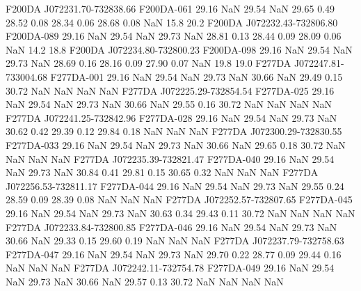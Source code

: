 F200DA J072231.70-732838.66   F200DA-061     29.16 NaN    29.54 NaN  29.65  0.49   28.52  0.08   28.34  0.06   28.68  0.08    NaN   15.8   20.2
F200DA J072232.43-732806.80   F200DA-089     29.16 NaN    29.54 NaN    29.73 NaN  28.81  0.13   28.44  0.09   28.09  0.06    NaN   14.2   18.8
F200DA J072234.80-732800.23   F200DA-098     29.16 NaN    29.54 NaN    29.73 NaN  28.69  0.16   28.16  0.09   27.90  0.07    NaN   19.8   19.0
F277DA J072247.81-733004.68   F277DA-001     29.16 NaN    29.54 NaN    29.73 NaN    30.66 NaN  29.49  0.15     30.72 NaN   NaN    NaN    NaN
F277DA J072225.29-732854.54   F277DA-025     29.16 NaN    29.54 NaN    29.73 NaN    30.66  NaN 29.55  0.16     30.72 NaN   NaN    NaN    NaN
F277DA J072241.25-732842.96   F277DA-028     29.16 NaN    29.54 NaN   29.73 NaN  30.62  0.42   29.39  0.12   29.84  0.18    NaN    NaN    NaN
F277DA J072300.29-732830.55   F277DA-033     29.16 NaN    29.54 NaN    29.73 NaN     30.66 NaN  29.65  0.18     30.72 NaN   NaN    NaN    NaN
F277DA J072235.39-732821.47   F277DA-040     29.16 NaN    29.54 NaN    29.73 NaN   30.84  0.41   29.81  0.15   30.65  0.32    NaN    NaN    NaN
F277DA J072256.53-732811.17   F277DA-044     29.16 NaN    29.54 NaN    29.73 NaN  29.55  0.24   28.59  0.09   28.39  0.08    NaN    NaN    NaN
F277DA J072252.57-732807.65   F277DA-045     29.16 NaN    29.54 NaN    29.73 NaN  30.63  0.34   29.43  0.11     30.72 NaN    NaN    NaN    NaN
F277DA J072233.84-732800.85   F277DA-046     29.16 NaN    29.54 NaN    29.73 NaN    30.66 NaN  29.33  0.15   29.60  0.19    NaN    NaN    NaN
F277DA J072237.79-732758.63   F277DA-047     29.16 NaN    29.54 NaN    29.73 NaN  29.70  0.22   28.77  0.09   29.44  0.16    NaN    NaN    NaN
F277DA J072242.11-732754.78   F277DA-049     29.16 NaN    29.54 NaN    29.73 NaN    30.66 NaN  29.57  0.13     30.72 NaN   NaN    NaN    NaN
